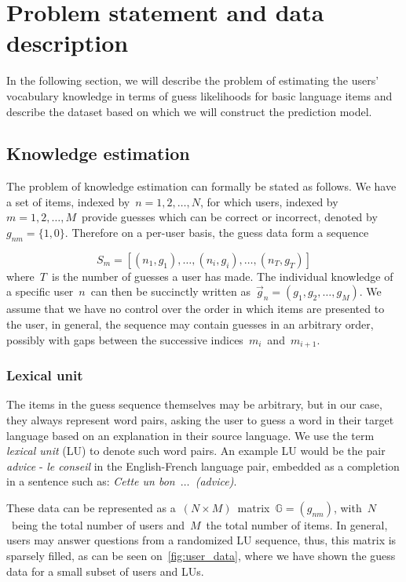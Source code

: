 \section{Problem statement and data description}
In the following section, we will describe the problem of estimating the users' vocabulary knowledge in terms of guess likelihoods for basic language items and describe the dataset based on which we will construct the prediction model.

\subsection{Knowledge estimation}
The problem of knowledge estimation can formally be stated as follows. We have a set of items, indexed by~$n = {1, 2, \dots, N}$, for which users, indexed by~$m  = {1, 2, \dots, M}$~provide guesses which can be correct or incorrect, denoted by~$g_{nm}=\{1, 0\}$. Therefore on a per-user basis, the guess data form a sequence

$$S_m = [(n_1, g_1), \dots, (n_i, g_i), \dots, (n_T, g_T)]$$
where~$T$~is the number of guesses a user has made. The individual knowledge of a specific user~$n$~can then be succinctly written as~$\vec{g}_n = (g_1, g_2, \dots, g_M)$. We assume that we have no control over the order in which items are presented to the user, in general, the sequence may contain guesses in an arbitrary order, possibly with gaps between the successive indices~$m_i$~and~$m_{i+1}$.

\subsubsection{Lexical unit}
The items in the guess sequence themselves may be arbitrary, but in our case, they always represent word pairs, asking the user to guess a word in their target language based on an explanation in their source language. We use the term \textit{lexical unit} (LU) to denote such word pairs. An example LU would be the pair \textit{advice} - \textit{le conseil} in the English-French language pair, embedded as a completion in a sentence such as: \textit{Cette un bon~$\dots$~(advice)}.

These data can be represented as a~$(N \times M)$~matrix~$\mathbb{G} = (g_{nm})$, with~$N$~being the total number of users and~$M$~the total number of items. In general, users may answer questions from a randomized LU sequence, thus, this matrix is sparsely filled, as can be seen on~\cref{fig:user_data}, where we have shown the guess data for a small subset of users and LUs.

